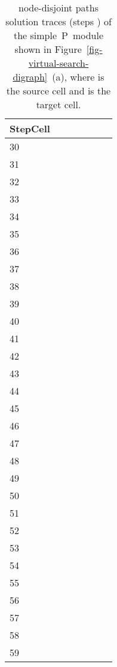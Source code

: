 \documentclass[preliminary,copyright,creativecommons]{eptcs}
\newcommand{\myway}[1]{\raisebox{-4pt}{\rule{0pt}{16pt}}\colorbox[rgb]{.7,.7,.7}{#1}}
\theoremstyle{remark}
\begin{document}
\begin{table}[h]
\caption{node-disjoint paths solution traces (steps ) of the 
simple~P~module shown in Figure~\ref{fig-virtual-search-digraph}~(a),
where  is the source cell and  is the target cell.}
\label{tab-trace1-node}
\begin{center}
\renewcommand{\tabcolsep}{3.0pt}
\renewcommand{\arraystretch}{1.3}
\footnotesize
\noindent
\begin{tabular}{ | l | l | l | l | l | l | l | }
\hline
StepCell
 &  &  &  &  &  &  \\ \hline
30 &  &  &  &  &  &  \\ \hline
31 &  &  &  &  &  &  \\ \hline
32 &  &  &  &  &  &  \\ \hline
33 &  &  &  &  &  &  \\ \hline
34 &  &  &  &  &  &  \\ \hline
35 &  &  &  &  &  &  \\ \hline
36 &  &  &  &  &  &  \\ \hline
37 &  &  &  &  &  &  \\ \hline
38 &  &  &  &  &  &  \\ \hline
39 &  &  &  &  &  &  \\ \hline
40 &  &  &  &  &  &  \\ \hline
41 &  &  &  &  &  &  \\ \hline
42 &  &  &  &  &  &  \\ \hline
43 &  &  &  &  &  &  \\ \hline
44 &  &  &  &  &  & \myway{} \\ \hline
45 &  &  &  &  & \myway{} &  \\ \hline
46 &  &  &  & \myway{} &  &  \\ \hline
47 &  &  & \myway{} &  &  &  \\ \hline
48 &  & \myway{} &  &  &  &  \\ \hline
49 & \myway{} &  &  &  &  &  \\ \hline
50 &  &  &  &  &  &  \\ \hline
51 &  &  &  &  &  &  \\ \hline
52 &  &  &  &  &  &  \\ \hline
53 &  &  &  &  &  &  \\ \hline
54 &  &  &  &  &  &  \\ \hline
55 &  &  &  &  &  &  \\ \hline
56 &  &  &  &  &  &  \\ \hline
57 &  &  &  &  &  &  \\ \hline
58 &  &  &  &  &  &  \\ \hline
59 & \myway{} & \myway{} & \myway{} & \myway{} & \myway{} & \myway{} \\ \hline
\end{tabular}
\end{center}
\end{table}
\end{document}
